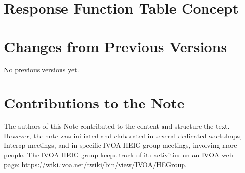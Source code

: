 \documentclass[11pt,a4paper]{ivoa}
\begin{document}
\pagebreak
\section{Response Function Table Concept}\label{sec:accessoptionsappendix}




\pagebreak
\section{Changes from Previous Versions}

No previous versions yet.

\pagebreak
\section{Contributions to the Note}

The authors of this Note contributed to the content and structure the text. However, the note was initiated and elaborated in several dedicated workshops, Interop meetings, and in specific \gls{IVOA} \gls{HEIG} group meetings, involving more people. The \gls{IVOA} \gls{HEIG} group keeps track of its activities on an \gls{IVOA} web page: \url{https://wiki.ivoa.net/twiki/bin/view/IVOA/HEGroup}.
\end{document}
